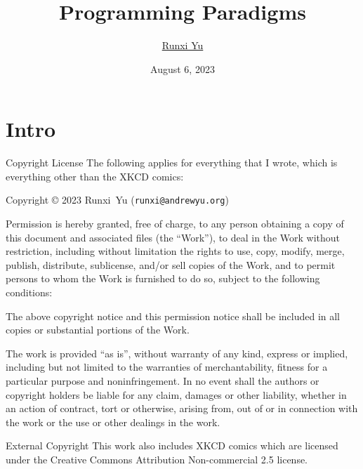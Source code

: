 \documentclass[aspectratio=169]{beamer}
\title{Programming Paradigms}
\author{\href{https://www.andrewyu.org/}{Runxi Yu}}
\institute{\textit{Colloquium Cognitionis Callidum} 2023}
\date{August 6, 2023}
\begin{document}
\maketitle

\section{Intro}

\begin{frame}{Copyright License}
	\small
	The following applies for everything that I wrote, which is everything other than the XKCD comics:

	Copyright © 2023 Runxi~Yu (\texttt{runxi@andrewyu.org})

	Permission is hereby granted, free of charge, to any person obtaining a copy of this document and associated files (the ``Work''), to deal in the Work without restriction, including without limitation the rights to use, copy, modify, merge, publish, distribute, sublicense, and/or sell copies of the Work, and to permit persons to whom the Work is furnished to do so, subject to the following conditions:

	The above copyright notice and this permission notice shall be included in all copies or substantial portions of the Work.

	The work is provided ``as is'', without warranty of any kind, express or implied, including but not limited to the warranties of merchantability, fitness for a particular purpose and noninfringement. In no event shall the authors or copyright holders be liable for any claim, damages or other liability, whether in an action of contract, tort or otherwise, arising from, out of or in connection with the work or the use or other dealings in the work.
\end{frame}

\begin{frame}{External Copyright}
	This work also includes XKCD comics which are licensed under the Creative Commons Attribution Non-commercial 2.5 license.
\end{frame}
\end{document}
